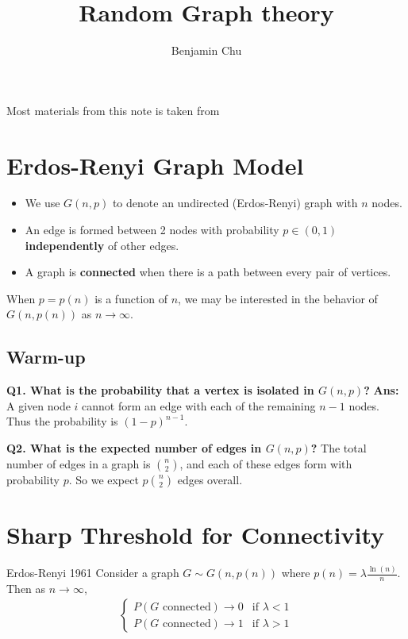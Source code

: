 \documentclass[./some_latex_template.tex]{subfiles}
\begin{document}
\title{Random Graph theory}
\author{Benjamin Chu}
\maketitle

Most materials from this note is taken from \cite{Acemoglu, Ramchandran}

\section{Erdos-Renyi Graph Model}

\begin{itemize}
	\item We use $G(n, p)$ to denote an undirected (Erdos-Renyi) graph with $n$ nodes.
	\item An edge is formed between 2 nodes with probability $p \in (0, 1)$ \textbf{independently} of other edges. 
	\item A graph is \textbf{connected} when there is a path between every pair of vertices. 
\end{itemize}

\noindent When $p = p(n)$ is a function of $n$, we may be interested in the behavior of $G(n, p(n))$ as $n \rightarrow \infty$. 

\subsection{Warm-up}

\textbf{Q1. What is the probability that a vertex is isolated in $G(n, p)$?} \textbf{Ans:} A given node $i$ cannot form an edge with each of the remaining $n - 1$ nodes. Thus the probability is $(1 - p)^{n-1}$. 

\noindent \textbf{Q2. What is the expected number of edges in $G(n, p)$?} The total number of edges in a graph is ${n \choose 2}$, and each of these edges form with probability $p$. So we expect $p{n \choose 2}$ edges overall. 

\section{Sharp Threshold for Connectivity}

\begin{theorembox}{Erdos-Renyi 1961}{}
Consider a graph $G \sim G(n, p(n))$ where $p(n) = \lambda \frac{\ln(n)}{n}$. Then as $n \rightarrow \infty$,
\begin{align*}
\begin{cases}
	P(G \text{ connected}) \rightarrow 0 & \text{if } \lambda < 1\\
	P(G \text{ connected}) \rightarrow 1 & \text{if } \lambda > 1
\end{cases}
\end{align*}
\end{theorembox}



\end{document}
